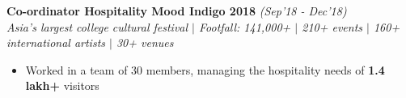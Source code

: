\documentclass{article}
\begin{document}
\textbf{Co-ordinator \textbar \hspace{} Hospitality \textbar \hspace{} Mood Indigo 2018} \hfill{\sl \small (Sep'18 - Dec'18)}\\
{\sl \small Asia's largest college cultural festival $|$ Footfall: 141,000+ $|$ 210+ events $|$ 160+ international artists $|$ 30+ venues}\\
\vspace{-17pt}
\begin{itemize}[itemsep = -0.75 mm, leftmargin=*]
\item Worked in a team of 30 members, managing the hospitality needs of \textbf{1.4 lakh+} visitors
\end{itemize}
\end{document}
